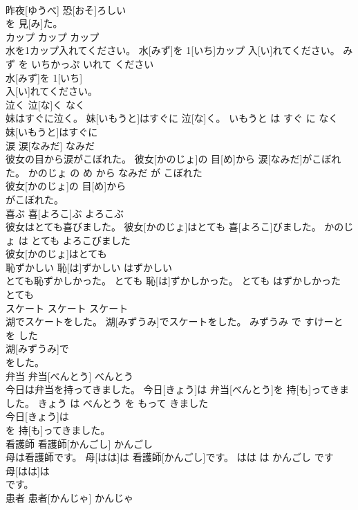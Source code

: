 \documentclass[8pt]{extreport}
\begin{document}
\begin{CJK}{UTF8}{min}
\\	昨夜[ゆうべ] 恐[おそ]ろしい
\\	を 見[み]た。		
\\	カップ	カップ	カップ	
\\	水を1カップ入れてください。	水[みず]を 1[いち]カップ 入[い]れてください。	みず を いちかっぷ いれて ください	
\\	水[みず]を 1[いち]
\\	入[い]れてください。		
\\	泣く	泣[な]く	なく	
\\	妹はすぐに泣く。	妹[いもうと]はすぐに 泣[な]く。	いもうと は すぐ に なく	
\\	妹[いもうと]はすぐに
\\	涙	涙[なみだ]	なみだ	
\\	彼女の目から涙がこぼれた。	彼女[かのじょ]の 目[め]から 涙[なみだ]がこぼれた。	かのじょ の め から なみだ が こぼれた	
\\	彼女[かのじょ]の 目[め]から
\\	がこぼれた。		
\\	喜ぶ	喜[よろこ]ぶ	よろこぶ	
\\	彼女はとても喜びました。	彼女[かのじょ]はとても 喜[よろこ]びました。	かのじょ は とても よろこびました	
\\	彼女[かのじょ]はとても
\\	恥ずかしい	恥[は]ずかしい	はずかしい	
\\	とても恥ずかしかった。	とても 恥[は]ずかしかった。	とても はずかしかった	
\\	とても
\\	スケート	スケート	スケート	
\\	湖でスケートをした。	湖[みずうみ]でスケートをした。	みずうみ で すけーと を した	
\\	湖[みずうみ]で
\\	をした。		
\\	弁当	弁当[べんとう]	べんとう	
\\	今日は弁当を持ってきました。	今日[きょう]は 弁当[べんとう]を 持[も]ってきました。	きょう は べんとう を もって きました	
\\	今日[きょう]は
\\	を 持[も]ってきました。		
\\	看護師	看護師[かんごし]	かんごし	
\\	母は看護師です。	母[はは]は 看護師[かんごし]です。	はは は かんごし です	
\\	母[はは]は
\\	です。		
\\	患者	患者[かんじゃ]	かんじゃ	

\end{CJK}
\end{document}
